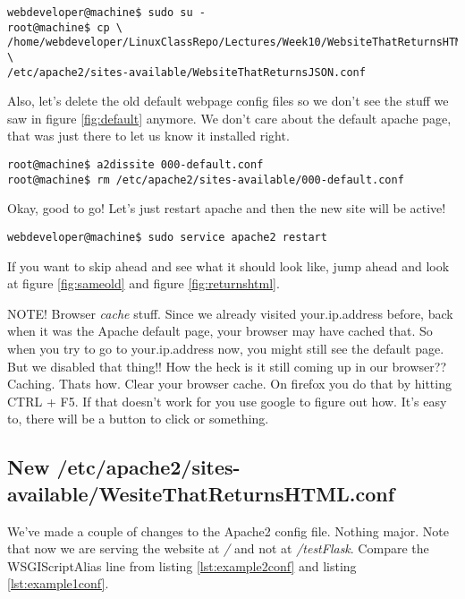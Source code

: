 \documentclass[10pt]{article}
\begin{document}
\pagebreak

\begin{lstlisting}[style=term, caption=Get the configuration file]
webdeveloper@machine$ sudo su -
root@machine$ cp \
/home/webdeveloper/LinuxClassRepo/Lectures/Week10/WebsiteThatReturnsHTML/WebsiteThatReturnsJSON.conf \
/etc/apache2/sites-available/WebsiteThatReturnsJSON.conf
\end{lstlisting}


Also, let's delete the old default webpage config files so we don't see the
stuff we saw in figure \ref{fig:default} anymore. We don't care about the
default apache page, that was just there to let us know it installed right.

\begin{lstlisting}[style=term,caption=get rid of default site]
root@machine$ a2dissite 000-default.conf
root@machine$ rm /etc/apache2/sites-available/000-default.conf
\end{lstlisting}

Okay, good to go! Let's just restart apache and then the new site will be
active!

\begin{lstlisting}[style=term, caption=Restart the apache2 service.]
webdeveloper@machine$ sudo service apache2 restart
\end{lstlisting}

If you want to skip ahead and see what it should look like, jump ahead and look
at figure \ref{fig:sameold} and figure \ref{fig:returnshtml}.

{\Large \color{red} NOTE! Browser \textit{cache} stuff. Since we already visited
your.ip.address before, back when it was the Apache default page, your browser
may have cached that. So when you try to go to your.ip.address now, you might
still see the default page. But we disabled that thing!! How the heck is it
still coming up in our browser?? Caching. Thats how. Clear your browser cache.
On firefox you do that by hitting CTRL + F5. If that doesn't work for you use
google to figure out how. It's easy to, there will be a button to click or
something. }


\subsection{New /etc/apache2/sites-available/WesiteThatReturnsHTML.conf}
We've made a couple of changes to the Apache2 config file. Nothing major. 
Note that now we are serving the website at \textit{/} and not at
\textit{/testFlask}. Compare the WSGIScriptAlias line from listing
\ref{lst:example2conf} and listing \ref{lst:example1conf}. 
 
\end{document}
